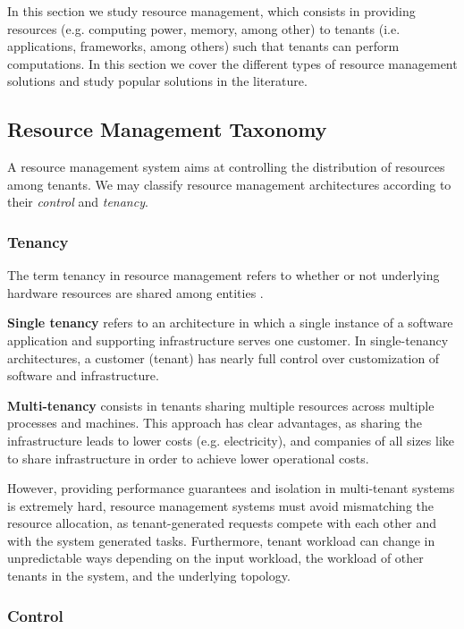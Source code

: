 
In this section we study resource management, which consists in providing resources (e.g. computing power, memory, among other) to tenants (i.e. applications, frameworks, among others) such that tenants can perform computations. In this section we cover the different types of resource management solutions and study popular solutions in the literature.

\subsection{Resource Management Taxonomy}

A resource management system aims at controlling the distribution of resources among tenants. We may classify resource management architectures according to their \textit{control} and \textit{tenancy}.

\subsubsection{Tenancy}

The term tenancy in resource management refers to whether or not underlying hardware resources are shared among entities \cite{Hong2019}.

\textbf{Single tenancy} refers to an architecture in which a single instance of a software application and supporting infrastructure serves one customer. In single-tenancy architectures, a customer (tenant) has nearly full control over customization of software and infrastructure.

\textbf{Multi-tenancy} consists in tenants sharing multiple resources across multiple processes and machines. This approach has clear advantages, as sharing the infrastructure leads to lower costs (e.g. electricity), and companies of all sizes like to share infrastructure in order to achieve lower operational costs.

However, providing performance guarantees and isolation in multi-tenant systems is extremely hard, resource management systems must avoid mismatching the resource allocation, as tenant-generated requests compete with each other and with the system generated tasks. Furthermore, tenant workload can change in unpredictable ways depending on the input workload, the workload of other tenants in the system, and the underlying topology.

\subsubsection{Control}

